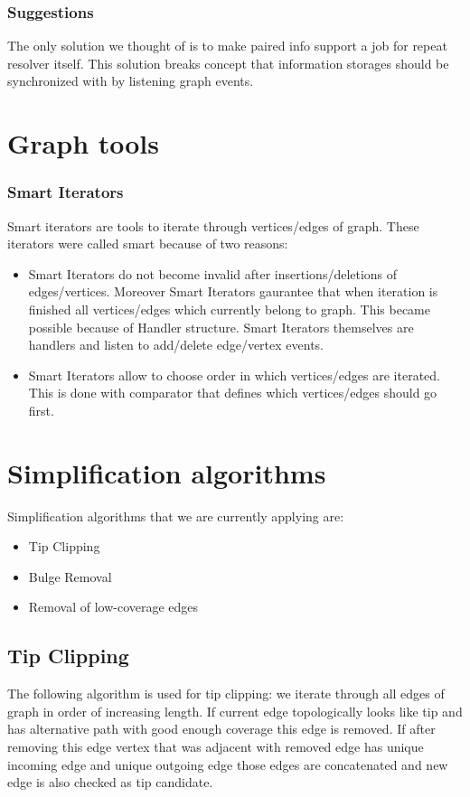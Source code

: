 \documentclass[12pt]{article}
\begin{document}
\subsubsection{Suggestions}

The only solution we thought of is to make paired info support a job for repeat resolver itself. This solution breaks concept that information storages should be synchronized with by listening graph events.

\section{Graph tools}
\subsubsection{Smart Iterators}

Smart iterators are tools to iterate through vertices/edges of graph. These iterators were called smart because of two reasons:
\begin{itemize}
\item Smart Iterators do not become invalid after insertions/deletions of edges/vertices. Moreover Smart Iterators gaurantee that when iteration is finished all vertices/edges which currently belong to graph. This became possible because of Handler structure. Smart Iterators themselves are handlers and listen to add/delete edge/vertex events.
\item Smart Iterators allow to choose order in which vertices/edges are iterated. This is done with comparator that defines which vertices/edges should go first.
\end{itemize}

\section{Simplification algorithms}
Simplification algorithms that we are currently applying are:
\begin{itemize}
\item Tip Clipping
\item Bulge Removal
\item Removal of low-coverage edges
\end{itemize}

\subsection{Tip Clipping}

The following algorithm is used for tip clipping: we iterate through all edges of graph in order of increasing length. If current edge topologically looks like tip and has alternative path with good enough coverage this edge is removed. If after removing this edge vertex that was adjacent with removed edge has unique incoming edge and unique outgoing edge those edges are concatenated and new edge is also checked as tip candidate.
\end{document}
